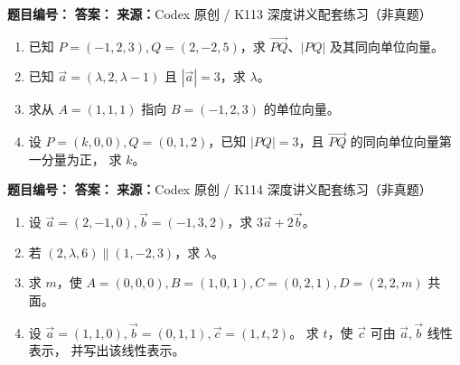 
\begin{problemBox}
\begin{problemMeta}
\textbf{题目编号：} \quad
\textbf{答案：} \quad
\textbf{来源：}Codex 原创 / K113 深度讲义配套练习（非真题）
\end{problemMeta}
\begin{enumerate}
  \item[\textbf{A}] 已知 \(P=(-1,2,3),Q=(2,-2,5)\)，求
  \(\overrightarrow{PQ}\)、\(|PQ|\) 及其同向单位向量。
  \item[\textbf{B}] 已知 \(\vec a=(\lambda,2,\lambda-1)\) 且
  \(|\vec a|=3\)，求 \(\lambda\)。
  \item[\textbf{C}] 求从 \(A=(1,1,1)\) 指向 \(B=(-1,2,3)\)
  的单位向量。
  \item[\textbf{M}] 设 \(P=(k,0,0),Q=(0,1,2)\)，已知
  \(|PQ|=3\)，且 \(\overrightarrow{PQ}\) 的同向单位向量第一分量为正，
  求 \(k\)。
\end{enumerate}
\end{problemBox}

\begin{problemBox}
\begin{problemMeta}
\textbf{题目编号：} \quad
\textbf{答案：} \quad
\textbf{来源：}Codex 原创 / K114 深度讲义配套练习（非真题）
\end{problemMeta}
\begin{enumerate}
  \item[\textbf{A}] 设 \(\vec a=(2,-1,0),\vec b=(-1,3,2)\)，求
  \(3\vec a+2\vec b\)。
  \item[\textbf{B}] 若 \((2,\lambda,6)\parallel(1,-2,3)\)，求
  \(\lambda\)。
  \item[\textbf{C}] 求 \(m\)，使
  \(A=(0,0,0),B=(1,0,1),C=(0,2,1),D=(2,2,m)\) 共面。
  \item[\textbf{M}] 设
  \(\vec a=(1,1,0),\vec b=(0,1,1),\vec c=(1,t,2)\)。
  求 \(t\)，使 \(\vec c\) 可由 \(\vec a,\vec b\) 线性表示，
  并写出该线性表示。
\end{enumerate}
\end{problemBox}

